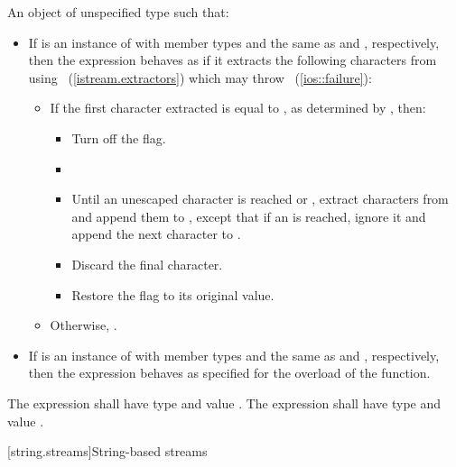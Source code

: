 \begin{itemdescr}
\pnum
\returns An object of unspecified type such that:
\begin{itemize}
\item If  is an instance of  with member types
 and  the same as 
and , respectively, then the expression
 behaves as if it extracts the following
characters from  using
~(\ref{istream.extractors})
which may throw \brk{}~(\ref{ios::failure}):
\begin{itemize}
\item If the first character extracted is equal to , as
determined by , then:
\begin{itemize}
\item Turn off the  flag.
\item {}
\item Until an unescaped  character is reached or ,
extract characters from  and append them to , except that
if an  is reached, ignore it and append the next character to
.
\item Discard the final  character.
\item Restore the  flag to its original value.
\end{itemize}
\item Otherwise, .
\end{itemize}
\item If  is an instance of  with member types
 and  the same as  and
, respectively, then the expression
 behaves as specified for the
 overload of the
 function.
\end{itemize}
The expression  shall have type
 and value . The expression
 shall have type
 and value .
\end{itemdescr}

[string.streams]{String-based streams}

